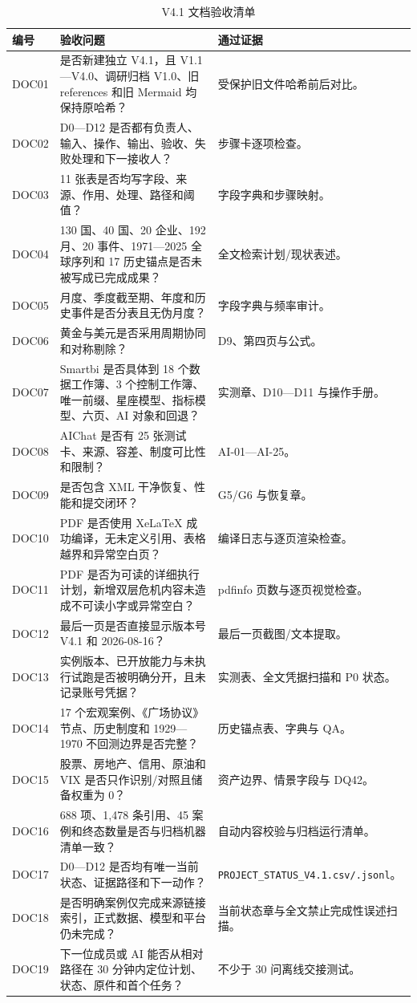 \documentclass[UTF8,fontset=windows,12pt,openany]{ctexbook}
\newcommand{\File}[1]{{\small\begingroup\urlstyle{same}\nolinkurl{#1}\endgroup}}
\begin{document}
\begin{longtable}{p{1.8cm}p{8.0cm}p{4.2cm}}
\caption{V4.1 文档验收清单}\label{tab:document-qa}\\
\toprule
\textbf{编号} & \textbf{验收问题} & \textbf{通过证据}\\
\midrule
DOC01 & 是否新建独立 V4.1，且 V1.1—V4.0、调研归档 V1.0、旧 references 和旧 Mermaid 均保持原哈希？ & 受保护旧文件哈希前后对比。\\
DOC02 & D0—D12 是否都有负责人、输入、操作、输出、验收、失败处理和下一接收人？ & 步骤卡逐项检查。\\
DOC03 & 11 张表是否均写字段、来源、作用、处理、路径和阈值？ & 字段字典和步骤映射。\\
DOC04 & 130 国、40 国、20 企业、192 月、20 事件、1971—2025 全球序列和 17 历史锚点是否未被写成已完成成果？ & 全文检索计划/现状表述。\\
DOC05 & 月度、季度截至期、年度和历史事件是否分表且无伪月度？ & 字段字典与频率审计。\\
DOC06 & 黄金与美元是否采用周期协同和对称剔除？ & D9、第四页与公式。\\
DOC07 & Smartbi 是否具体到 18 个数据工作簿、3 个控制工作簿、唯一前缀、星座模型、指标模型、六页、AI 对象和回退？ & 实测章、D10—D11 与操作手册。\\
DOC08 & AIChat 是否有 25 张测试卡、来源、容差、制度可比性和限制？ & AI-01—AI-25。\\
DOC09 & 是否包含 XML 干净恢复、性能和提交闭环？ & G5/G6 与恢复章。\\
DOC10 & PDF 是否使用 XeLaTeX 成功编译，无未定义引用、表格越界和异常空白页？ & 编译日志与逐页渲染检查。\\
DOC11 & PDF 是否为可读的详细执行计划，新增双层危机内容未造成不可读小字或异常空白？ & pdfinfo 页数与逐页视觉检查。\\
DOC12 & 最后一页是否直接显示版本号 V4.1 和 2026-08-16？ & 最后一页截图/文本提取。\\
DOC13 & 实例版本、已开放能力与未执行试跑是否被明确分开，且未记录账号凭据？ & 实测表、全文凭据扫描和 P0 状态。\\
DOC14 & 17 个宏观案例、《广场协议》节点、历史制度和 1929—1970 不回测边界是否完整？ & 历史锚点表、字典与 QA。\\
DOC15 & 股票、房地产、信用、原油和 VIX 是否只作识别/对照且储备权重为 0？ & 资产边界、情景字段与 DQ42。\\
DOC16 & 688 项、1,478 条引用、45 案例和终态数量是否与归档机器清单一致？ & 自动内容校验与归档运行清单。\\
DOC17 & D0—D12 是否均有唯一当前状态、证据路径和下一动作？ & \File{PROJECT_STATUS_V4.1.csv/.jsonl}。\\
DOC18 & 是否明确案例仅完成来源链接索引，正式数据、模型和平台仍未完成？ & 当前状态章与全文禁止完成性误述扫描。\\
DOC19 & 下一位成员或 AI 能否从相对路径在 30 分钟内定位计划、状态、原件和首个任务？ & 不少于 30 问离线交接测试。\\
\bottomrule
\end{longtable}
\end{document}

